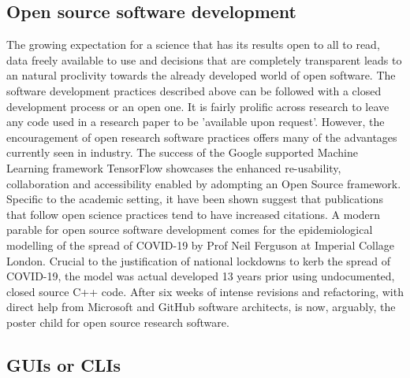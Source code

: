 \documentclass{SBCbookchapter}
\begin{document}

\subsection{Open source software development}

The growing expectation for a science that has its results open to all to read, data freely available to use and decisions that are completely transparent leads to an natural proclivity towards the already developed world of open software. The software development practices described above can be followed with a closed development process or an open one. It is fairly prolific across research to leave any code used in a research paper to be 'available upon request'. However, the encouragement of open research software practices offers many of the advantages currently seen in industry. The success of the Google supported Machine Learning framework TensorFlow showcases the enhanced re-usability, collaboration and accessibility enabled by adompting an Open Source framework. Specific to the academic setting,  it have been shown suggest that publications that follow open science practices tend to have increased citations. A modern parable for open source software development comes for the epidemiological modelling of the spread of COVID-19 by Prof Neil Ferguson at Imperial Collage London. Crucial to the justification of national lockdowns to kerb the spread of COVID-19, the model was actual developed 13 years prior using undocumented, closed source C++ code. After six weeks of intense revisions and refactoring, with direct help from Microsoft and GitHub software architects,  is now, arguably, the poster child for open source research software.




\subsection{GUIs or CLIs}
\end{document}
